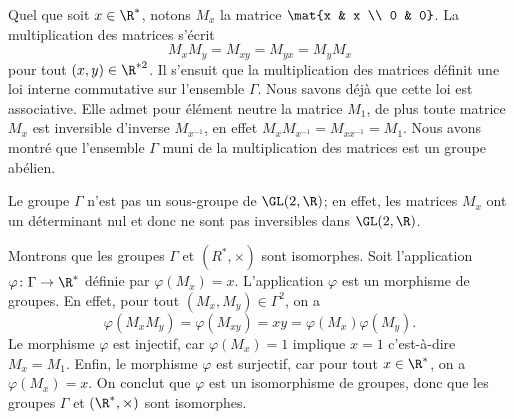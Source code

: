 Quel que soit $x\in\R^*$, notons $M_x$ la matrice $\mat{x & x \\ 0 & 0}$.
La multiplication des matrices s'écrit
\[
  M_xM_y = M_{xy} = M_{yx} = M_yM_x
\]
pour tout $(x,y)\in\R^{*2}$. Il s'ensuit que la multiplication des matrices
définit une loi interne commutative sur l'ensemble $\Gamma$. Nous savons déjà
que cette loi est associative.  Elle admet pour élément neutre la matrice $M_1$,
de plus toute matrice $M_x$ est inversible d'inverse $M_{x^{-1}}$, en effet $M_x
M_{x^{-1}} = M_{x x^{-1}} = M_1$.  Nous avons montré que l'ensemble $\Gamma$ 
muni de la multiplication des matrices est un groupe abélien.

Le groupe $\Gamma$ n'est pas un sous-groupe de $\GL(2,\R)$; en effet, les
matrices $M_x$ ont un déterminant nul et donc ne sont pas inversibles dans
$\GL(2,\R)$.

Montrons que les groupes $\Gamma$ et $(R^*,\times)$ sont isomorphes.
Soit l'application $\varphi\colon\Gamma\rightarrow\R^*$ définie par
$\varphi(M_x) = x$. L'application $\varphi$ est un morphisme de groupes. En
effet, pour tout $(M_x,M_y)\in\Gamma^2$, on a
\[
  \varphi(M_x M_y) = \varphi(M_{xy}) = xy = \varphi(M_x)\varphi(M_y).
\]
Le morphisme $\varphi$ est injectif, car $\varphi(M_x) = 1$ implique $x=1$
c'est-à-dire $M_x = M_1$. Enfin, le morphisme $\varphi$ est surjectif, car pour
tout $x\in\R^*$, on a $\varphi(M_x) = x$. On conclut que $\varphi$ est un
isomorphisme de groupes, donc que les groupes $\Gamma$ et $(\R^*,\times)$ sont
isomorphes.

